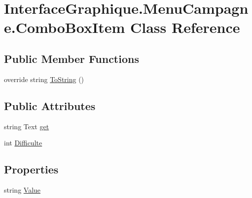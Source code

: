 \hypertarget{class_interface_graphique_1_1_menu_campagne_1_1_combo_box_item}{\section{Interface\-Graphique.\-Menu\-Campagne.\-Combo\-Box\-Item Class Reference}
\label{class_interface_graphique_1_1_menu_campagne_1_1_combo_box_item}
}
\subsection*{Public Member Functions}
\begin{DoxyCompactItemize}
\item 
override string \hyperlink{class_interface_graphique_1_1_menu_campagne_1_1_combo_box_item_ae18b58ca549af71043b57edffd6cfa6f}{To\-String} ()
\end{DoxyCompactItemize}
\subsection*{Public Attributes}
\begin{DoxyCompactItemize}
\item 
string Text \hyperlink{class_interface_graphique_1_1_menu_campagne_1_1_combo_box_item_a6ca0abfd516a8df4faf602c9303319ea}{get}
\item 
int \hyperlink{class_interface_graphique_1_1_menu_campagne_1_1_combo_box_item_a044d419a44ff271f53a7e7f006064f4c}{Difficulte}
\end{DoxyCompactItemize}
\subsection*{Properties}
\begin{DoxyCompactItemize}
\item 
string \hyperlink{class_interface_graphique_1_1_menu_campagne_1_1_combo_box_item_af32e2bf5eed166e54ce322627482cbff}{Value}
\end{DoxyCompactItemize}


